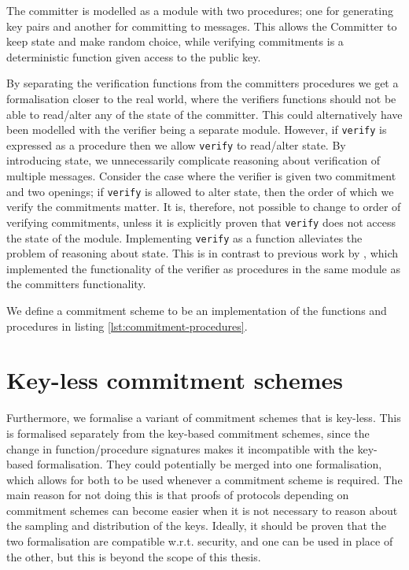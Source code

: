 The committer is modelled as a module with two procedures; one for generating
key pairs and another for committing to messages. This allows the Committer
to keep state and make random choice, while verifying commitments is a
deterministic function given access to the public key.

By separating the verification functions from the committers procedures we get a
formalisation closer to the real world, where the verifiers functions should not
be able to read/alter any of the state of the committer. This could alternatively have
been modelled with the verifier being a separate module.
However, if \texttt{verify} is expressed as a procedure
then we allow \texttt{verify} to read/alter state. By introducing state, we
unnecessarily complicate reasoning about verification of multiple messages.
Consider the case where the verifier is given two commitment and two openings;
if \texttt{verify} is allowed to alter state, then the order of which we verify
the commitments matter. It is, therefore, not possible to change to order of
verifying commitments, unless it is explicitly proven that \texttt{verify} does
not access the state of the module.
Implementing \texttt{verify} as a function alleviates the problem of reasoning
about state.
This is in contrast to previous work by \citet{DBLP:journals/corr/MetereD17}, which
implemented the functionality of the verifier as procedures in the same
module as the committers functionality.

We define a commitment scheme to be an implementation of the functions and
procedures in listing \ref{lst:commitment-procedures}.

\section{Key-less commitment schemes}
\label{sec:commitment:key-less}
Furthermore, we formalise a variant of commitment schemes that is key-less. This
is formalised separately from the key-based commitment schemes, since the
change in function/procedure signatures makes it incompatible with the key-based
formalisation. They could potentially be merged into one formalisation, which
allows for both to be used whenever a commitment scheme is required. The main
reason for not doing this is that proofs of protocols depending on commitment
schemes can become easier when it is not necessary to reason about the sampling
and distribution of the keys. Ideally, it should be
proven that the two formalisation are compatible w.r.t. security, and one can be
used in place of the other, but this is beyond the scope of this thesis.

